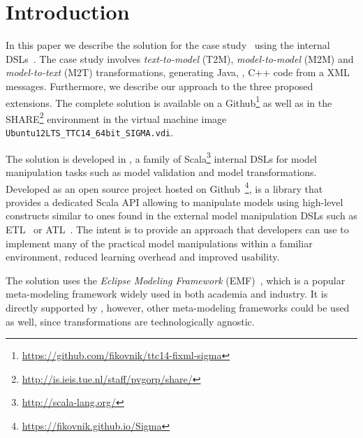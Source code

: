
\section{Introduction}
\label{sec:Introduction}

In this paper we describe the solution for the \TTC \FIXML case study~\cite{Lano2014} using the \SIGMA internal DSLs~\cite{Krikava2014}.
The case study involves \emph{text-to-model} (T2M), \emph{model-to-model} (M2M) and \emph{model-to-text} (M2T) transformations, generating Java, \Csharp, C++ code from a \FIXML XML messages.
Furthermore, we describe our approach to the three proposed extensions.
The complete solution is available on a Github\footnote{\url{https://github.com/fikovnik/ttc14-fixml-sigma}} as well as in the SHARE\footnote{\url{http://is.ieis.tue.nl/staff/pvgorp/share/}} environment in the virtual machine image \texttt{Ubuntu12LTS\_TTC14\_64bit\_SIGMA.vdi}.

The solution is developed in \SIGMA, a family of Scala\footnote{\url{http://scala-lang.org/}} internal DSLs for model manipulation tasks such as model validation and model transformations.
Developed as an open source project hosted on Github~\footnote{\url{https://fikovnik.github.io/Sigma}},
\SIGMA is a library that provides a dedicated Scala API allowing to manipulate models using high-level constructs similar to ones found in the external model manipulation DSLs such as ETL~\cite{Kolovos2008a} or ATL~\cite{Jouault2006}.
The intent is to provide an approach that developers can use to implement many of the practical model manipulations within a familiar environment, reduced learning overhead and improved usability.

The solution uses the \emph{Eclipse Modeling Framework} (EMF)~\cite{EMF}, which is a popular meta-modeling framework widely used in both academia and industry.
It is directly supported by \SIGMA, however, other meta-modeling frameworks could be used as well, since \SIGMA transformations are technologically agnostic.

